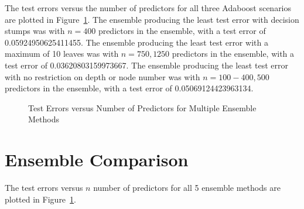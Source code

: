 \documentclass[12pt]{article}
\begin{document}
The test errors versus the number of predictors for all three Adaboost scenarios are plotted in Figure~\ref{fig:ensemble}. The ensemble producing the least test error with decision stumps was with $n = 400$ predictors in the ensemble, with a test error of 0.05924950625411455. The ensemble producing the least test error with a maximum of 10 leaves was with $n = 750, 1250$ predictors in the ensemble, with a test error of 0.03620803159973667. The ensemble producing the least test error with no restriction on depth or node number was with $n = 100-400, 500$ predictors in the ensemble, with a test error of 0.05069124423963134.

\begin{figure}[htp]
\centering
{}
\caption{Test Errors versus Number of Predictors for Multiple Ensemble Methods}
\label{fig:ensemble}
\end{figure}

\section*{Ensemble Comparison}
The test errors versus $n$ number of predictors for all 5 ensemble methods are plotted in Figure~\ref{fig:ensemble}. 
\end{document}
